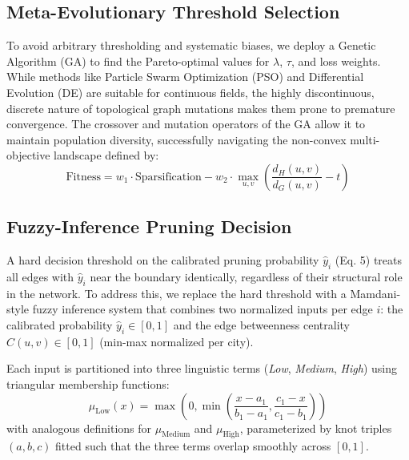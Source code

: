 \documentclass[journal]{IEEEtran}
\begin{document}
\subsection{Meta-Evolutionary Threshold Selection}
To avoid arbitrary thresholding and systematic biases, we deploy a Genetic Algorithm (GA) to find the Pareto-optimal values for $\lambda$, $\tau$, and loss weights. While methods like Particle Swarm Optimization (PSO) and Differential Evolution (DE) are suitable for continuous fields, the highly discontinuous, discrete nature of topological graph mutations makes them prone to premature convergence. The crossover and mutation operators of the GA allow it to maintain population diversity, successfully navigating the non-convex multi-objective landscape defined by:
\begin{equation}
    \text{Fitness} = w_1 \cdot \text{Sparsification} - w_2 \cdot \max_{u,v} \left( \frac{d_H(u,v)}{d_G(u,v)} - t \right)
\end{equation}
\subsection{Fuzzy-Inference Pruning Decision}
\label{sec:fuzzy}
 
A hard decision threshold on the calibrated pruning probability $\hat{y}_i$ (Eq. 5) treats all edges with $\hat{y}_i$ near the boundary identically, regardless of their structural role in the network. To address this, we replace the hard threshold with a Mamdani-style fuzzy inference system that combines two normalized inputs per edge $i$: the calibrated probability $\hat{y}_i \in [0,1]$ and the edge betweenness centrality $C(u,v) \in [0,1]$ (min-max normalized per city).
 
Each input is partitioned into three linguistic terms (\textit{Low}, \textit{Medium}, \textit{High}) using triangular membership functions:
\begin{equation}
    \mu_{\text{Low}}(x) = \max\left(0, \min\left(\frac{x - a_1}{b_1 - a_1}, \frac{c_1 - x}{c_1 - b_1}\right)\right)
\end{equation}
with analogous definitions for $\mu_{\text{Medium}}$ and $\mu_{\text{High}}$, parameterized by knot triples $(a,b,c)$ fitted such that the three terms overlap smoothly across $[0,1]$.
 
\end{document}
